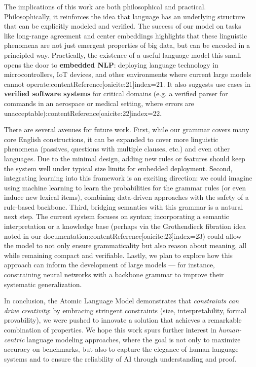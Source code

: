 \documentclass[11pt]{article}
\begin{document}
The implications of this work are both philosophical and practical. Philosophically, it reinforces the idea that language has an underlying structure that can be explicitly modeled and verified. The success of our model on tasks like long-range agreement and center embeddings highlights that these linguistic phenomena are not just emergent properties of big data, but can be encoded in a principled way. Practically, the existence of a useful language model this small opens the door to \textbf{embedded NLP}: deploying language technology in microcontrollers, IoT devices, and other environments where current large models cannot operate:contentReference[oaicite:21]{index=21}. It also suggests use cases in \textbf{verified software systems} for critical domains (e.g. a verified parser for commands in an aerospace or medical setting, where errors are unacceptable):contentReference[oaicite:22]{index=22}.

There are several avenues for future work. First, while our grammar covers many core English constructions, it can be expanded to cover more linguistic phenomena (passives, questions with multiple clauses, etc.) and even other languages. Due to the minimal design, adding new rules or features should keep the system well under typical size limits for embedded deployment. Second, integrating learning into this framework is an exciting direction: we could imagine using machine learning to learn the probabilities for the grammar rules (or even induce new lexical items), combining data-driven approaches with the safety of a rule-based backbone. Third, bridging semantics with this grammar is a natural next step. The current system focuses on syntax; incorporating a semantic interpretation or a knowledge base (perhaps via the Grothendieck fibration idea noted in our documentation:contentReference[oaicite:23]{index=23}) could allow the model to not only ensure grammaticality but also reason about meaning, all while remaining compact and verifiable. Lastly, we plan to explore how this approach can inform the development of large models — for instance, constraining neural networks with a backbone grammar to improve their systematic generalization.

In conclusion, the Atomic Language Model demonstrates that \emph{constraints can drive creativity}: by embracing stringent constraints (size, interpretability, formal provability), we were pushed to innovate a solution that achieves a remarkable combination of properties. We hope this work spurs further interest in \emph{human-centric} language modeling approaches, where the goal is not only to maximize accuracy on benchmarks, but also to capture the elegance of human language systems and to ensure the reliability of AI through understanding and proof. 
\end{document}
